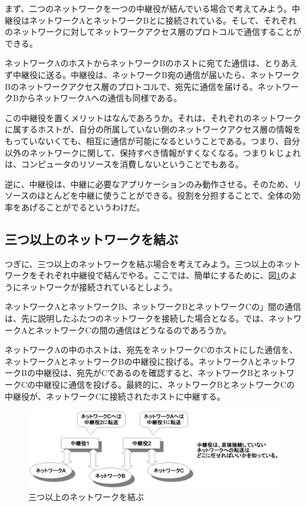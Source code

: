 まず、二つのネットワークを一つの中継役が結んでいる場合で考えてみよう。中継役はネットワークAとネットワークBとに接続されている。そして、それぞれのネットワークに対してネットワークアクセス層のプロトコルで通信することができる。

ネットワークAのホストからネットワークBのホストに宛てた通信は、とりあえず中継役に送る。中継役は、ネットワークB宛の通信が届いたら、ネットワークBのネットワークアクセス層のプロトコルで、宛先に通信を届ける。ネットワークBからネットワークAへの通信も同様である。

この中継役を置くメリットはなんであろうか。それは、それぞれのネットワークに属するホストが、自分の所属していない側のネットワークアクセス層の情報をもっていないくても、相互に通信が可能になるということである。つまり、自分以外のネットワークに関して、保持すべき情報がすくなくなる。つまりｋじょれは、コンピュータのリソースを消費しないということでもある。

逆に、中継役は、中継に必要なアプリケーションのみ動作させる。そのため、リソースのほとんどを中継に使うことができる。役割を分担することで、全体の効率をあげることがでるというわけだ。

\subsection{三つ以上のネットワークを結ぶ}

つぎに、三つ以上のネットワークを結ぶ場合を考えてみよう。三つ以上のネットワークをそれぞれ中継役で結んでやる。ここでは、簡単にするために、図\ref{fig:ip_basic3}のようにネットワークが接続されているとしよう。

ネットワークAとネットワークB、ネットワークBとネットワークCの」間の通信は、先に説明したふたつのネットワークを接続した場合となる。では、ネットワークAとネットワークCの間の通信はどうなるのであろうか。

ネットワークAの中のホストは、宛先をネットワークCのホストにした通信を、ネットワークAとネットワークBの中継役に投げる。ネットワークAとネットワークBの中継役は、宛先がCであるのを確認すると、ネットワークBとネットワークCの中継役に通信を投げる。最終的に、ネットワークBとネットワークCの中継役が、ネットワークCに接続されたホストに中継する。

\begin{figure}[htbp]
	\includegraphics[width=12cm,clip]{draw/ip_basic3.eps}
	\caption{三つ以上のネットワークを結ぶ}
	\label{fig:ip_basic3}
\end{figure}

